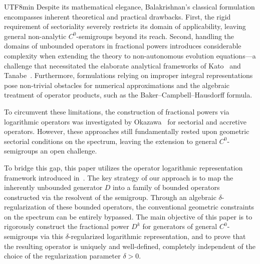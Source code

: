 \documentclass[10pt,a4paper]{article}
\theoremstyle{definition}
\theoremstyle{remark}
\begin{document}
\begin{CJK}{UTF8}{min}
Despite its mathematical elegance, Balakrishnan's classical formulation encompasses inherent theoretical and practical drawbacks. 
First, the rigid requirement of sectoriality severely restricts its domain of applicability, leaving general non-analytic $C^0$-semigroups beyond its reach. 
Second, handling the domains of unbounded operators in fractional powers introduces considerable complexity when extending the theory to non-autonomous evolution equations—a challenge that necessitated the elaborate analytical frameworks of Kato~\cite{61kato,80kato} and Tanabe~\cite{79tanabe}. 
Furthermore, formulations relying on improper integral representations pose non-trivial obstacles for numerical approximations and the algebraic treatment of operator products, such as the Baker--Campbell--Hausdorff formula.

To circumvent these limitations, the construction of fractional powers via logarithmic operators was investigated by Okazawa~\cite{86okazawa, 96okazawa} for sectorial and accretive operators. 
However, these approaches still fundamentally rested upon geometric sectorial conditions on the spectrum, leaving the extension to general $C^0$-semigroups an open challenge.

To bridge this gap, this paper utilizes the operator logarithmic representation framework introduced in~\cite{23iwata}. 
The key strategy of our approach is to map the inherently unbounded generator $D$ into a family of bounded operators constructed via the resolvent of the semigroup. 
Through an algebraic $\delta$-regularization of these bounded operators, the conventional geometric constraints on the spectrum can be entirely bypassed. 
The main objective of this paper is to rigorously construct the fractional power $D^k$ for generators of general $C^0$-semigroups via this $\delta$-regularized logarithmic representation, and to prove that the resulting operator is uniquely and well-defined, completely independent of the choice of the regularization parameter $\delta > 0$.



\end{CJK}
\end{document}
